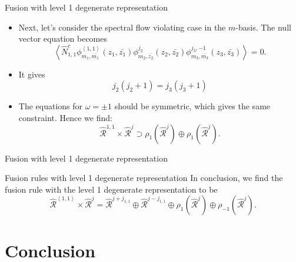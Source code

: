 \documentclass{beamer}
\newcommand{\vev}[1]{\left\langle #1 \right\rangle}
\begin{document}
\begin{frame}{Fusion with level 1 degenerate representation}
  \begin{itemize}
    \item Next, let's consider the spectral flow violating case in the $m$-basis. The null vector equation becomes
      \begin{equation}
          \vev{\hat{N}^{c}_{1,1} \phi^{\vev{1,1}}_{m_{1},\bar{m_{1}}}(z_{1},\bar{z_{1}}) \phi^{j_{2}}_{m_{2},\bar{z_{2}}}(z_{2},\bar{z_{2}}) 
          \phi^{j_{3},-1}_{m_{3},\bar{m_{3}}}(z_{3},\bar{z_{3}})} = 0.
      \end{equation}
    \item It gives 
      \begin{equation}
        j_{2}(j_{2}+1) = j_{3} (j_{3}+1)
      \end{equation}
    \item The equations for $\omega = \pm 1$ should be symmetric, which gives the same constraint. Hence we find: 
      \begin{equation}
        \hat{\mathcal{R}}^{1,1} \times \hat{\mathcal{R}}^{j} \supset \rho_{ 1} \left(\hat{\mathcal{R}}^{j}\right) \oplus \rho_{ 1} \left(\hat{\mathcal{R}}^{j}\right).
      \end{equation}
  \end{itemize}
\end{frame}

\begin{frame}{Fusion with level 1 degenerate representation}
    \begin{block}{Fusion rules with level 1 degenerate representation}
      In conclusion, we find the fusion rule with the level 1 degenerate representation to be
      \begin{equation}
        \widehat{\mathcal{R}}^{\vev{1,1}} \times \widehat{\mathcal{R}}^{j} = \widehat{\mathcal{R}}^{j+j_{1,1}} \oplus \widehat{\mathcal{R}}^{j-j_{1,1}}
    \oplus \rho_{1} \left( \widehat{\mathcal{R}}^{j} \right) \oplus \rho_{-1} \left( \widehat{\mathcal{R}}^{j} \right). \label{mainresult}
      \end{equation}
    \end{block}
\end{frame}

\section{Conclusion}
\end{document}
